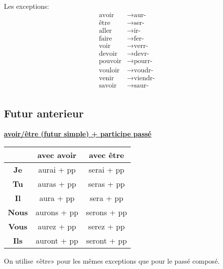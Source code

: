 \documentclass[12pt, a4paper]{article}
\begin{document}
\begin{multicols*}{3}
Les exceptions:
\begin{align*}
  \text{avoir} &\rightarrow \text{aur-}\\ 
  \text{être} &\rightarrow \text{ser-}\\ 
  \text{aller} &\rightarrow \text{ir-}\\ 
  \text{faire} &\rightarrow \text{fer-}\\ 
  \text{voir} &\rightarrow \text{verr-}\\ 
  \text{devoir} &\rightarrow \text{devr-}\\ 
  \text{pouvoir} &\rightarrow \text{pourr-}\\ 
  \text{vouloir} &\rightarrow \text{voudr-}\\ 
  \text{venir} &\rightarrow \text{viendr-}\\ 
  \text{savoir} &\rightarrow \text{saur-}\\ 
\end{align*}

\subsection{Futur anterieur}
\begin{center}
\underline{\textbf{avoir/être (futur simple) + participe passé}}
\begin{tabular}{|c|c|c|}
  \hline
  & \textbf{avec avoir} & \textbf{avec être}\\\hline
  \textbf{Je} & aurai + pp & serai + pp \\\hline
  \textbf{Tu} & auras + pp & seras + pp \\\hline
  \textbf{Il} & aura + pp & sera + pp \\\hline
  \textbf{Nous} & aurons + pp & serons + pp \\\hline
  \textbf{Vous} & aurez + pp & serez + pp \\\hline
  \textbf{Ils} & auront + pp & seront + pp \\\hline
\end{tabular}
\end{center}

On utilise «être» pour les mêmes exceptions que pour le passé composé.
\colbreak


\end{multicols*}
\end{document}
